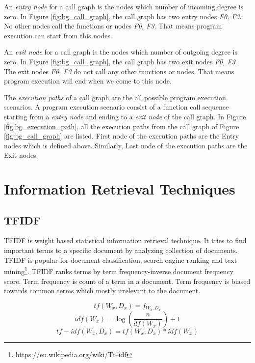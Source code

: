 An \emph{entry node} for a call graph is the nodes which number of incoming degree is zero. In Figure \ref{fig:bg_call_graph}, the call graph has two entry nodes \emph{F0, F3}. No other nodes call the functions or nodes \emph{F0, F3}. That means program execution can start from this nodes.

An \emph{exit node} for a call graph is the nodes which number of outgoing degree is zero. In Figure \ref{fig:bg_call_graph}, the call graph has two exit nodes \emph{F0, F3}. The exit nodes \emph{F0, F3} do not call any other functions or nodes. That means program execution will end when we come to this node.


The \emph{execution paths} of a call graph are the all possible program execution scenarios. A program execution scenario consist of a function call sequence starting from a \emph{entry node} and ending to a \emph{exit node} of the call graph. In Figure \ref{fig:bg_execution_path}, all the execution paths from the call graph of Figure \ref{fig:bg_call_graph} are listed. First node of the execution paths are the Entry nodes which is defined above. Similarly, Last node of the execution paths are the Exit nodes. 






\section{Information Retrieval Techniques}
\subsection{TFIDF}
TFIDF is weight based statistical information retrieval technique. It tries to find important terms to a specific document by analyzing collection of documents. TFIDF is popular for document classification, search engine ranking and text mining\footnote{https://en.wikipedia.org/wiki/Tf–idf}. TFIDF ranks terms by term frequency-inverse document frequency score. Term frequency is count of a term in a document. Term frequency is biased towards common terms which mostly irrelevant to the document. 

\begin{equation}
    tf (W_x, D_x) = f_{W_x,D_x}
    \label{eq:tf_background}
\end{equation}
\begin{equation}
    idf(W_x) = \log(\frac{n}{df(W_x)})+1
    \label{eq:idf_background}
\end{equation}
\begin{equation}
    tf-idf(W_x, D_x) = tf(W_x,D_x) * idf(W_x)
    \label{eq:TFIDF_background}
\end{equation}


